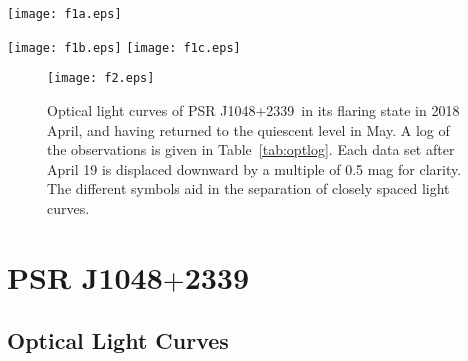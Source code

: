 \documentclass[iop]{emulateapj}
\newcommand{\msptwo}{PSR J1048$+$2339}
\begin{document}
\begin{figure*}
\begin{minipage}[b]{0.5\textwidth}
\texttt{[image: f1a.eps]}
\end{minipage}
\begin{minipage}[b]{0.5\textwidth}
\texttt{[image: f1b.eps]}
\vspace{0.17cm}
\texttt{[image: f1c.eps]}
\end{minipage}
\vspace{-0.1in}
\caption{Optical light curves of \msptwo\ as a function of orbital phase.
 A log of the observations is given in Table~\ref{tab:optlog}.
 In each panel data sets below the uppermost one
 are displaced downward by a multiple of 0.5 mag for clarity.
}
\vspace{0.2in}
\label{fig:image2}
\end{figure*}

\begin{figure}
\centerline{
\texttt{[image: f2.eps]}
}
\caption{Optical light curves of \msptwo\ in its flaring state in
 2018 April, and having returned to the quiescent level in May.
 A log of the observations is given in Table~\ref{tab:optlog}.
 Each data set after April 19 is
 displaced downward by a multiple of 0.5 mag for clarity.
 The different symbols aid in the separation of
 closely spaced light curves.
}
\label{fig:flare}
\end{figure}

\section{\msptwo}

\subsection{Optical Light Curves}
\end{document}
